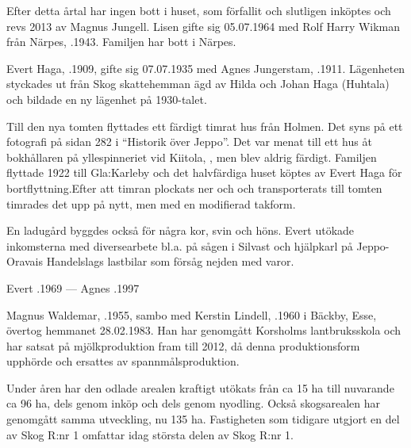 Efter detta årtal har ingen bott i huset, som förfallit och slutligen inköptes och revs 2013 av Magnus Jungell. Lisen gifte sig 05.07.1964 med Rolf Harry Wikman från Närpes, .1943. Familjen har bott i Närpes.


%
Evert Haga, .1909, gifte sig 07.07.1935  med Agnes Jungerstam, .1911. Lägenheten styckades ut från Skog skattehemman ägd av Hilda och Johan Haga (Huhtala) och bildade en  ny lägenhet på 1930-talet.

Till den nya tomten flyttades ett färdigt timrat hus från Holmen. Det syns på ett fotografi på sidan 282 i ``Historik över Jeppo''. Det var menat till ett hus åt bokhållaren på yllespinneriet vid Kiitola, , men blev aldrig färdigt. Familjen flyttade 1922 till Gla:Karleby och det halvfärdiga huset köptes av Evert Haga för bortflyttning.Efter att timran plockats ner och och transporterats till tomten timrades det upp på nytt, men med en modifierad takform.

En ladugård byggdes också för några kor, svin och höns. Evert utökade inkomsterna med diversearbete bl.a. på sågen i Silvast och hjälpkarl på Jeppo-Oravais Handelslags lastbilar som försåg nejden med varor.

Evert .1969   ---    Agnes .1997



%



%
Magnus Waldemar, .1955, sambo med Kerstin Lindell, .1960 i Bäckby, Esse, övertog hemmanet 28.02.1983. Han har genomgått Korsholms lantbruksskola och har satsat på mjölkproduktion fram till 2012, då denna produktionsform upphörde och ersattes av spannmålsproduktion.

Under åren har den odlade arealen kraftigt utökats från ca 15 ha till nuvarande ca 96 ha, dels genom inköp och dels genom nyodling. Också skogsarealen har genomgått samma utveckling, nu 135 ha. Fastigheten som tidigare utgjort en del av Skog R:nr 1 omfattar idag största delen av Skog R:nr 1.

